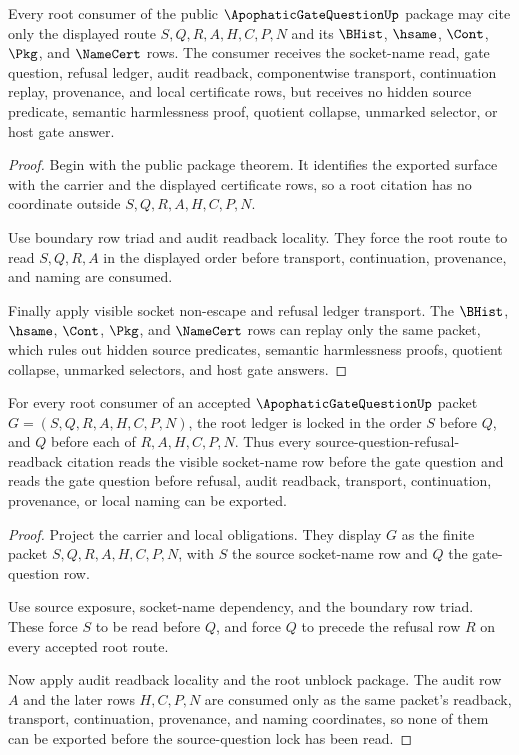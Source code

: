 \begin{theorem}
\label{thm:apophatic-gate-question-root-unblock-package}
Every root consumer of the public $\ApophaticGateQuestionUp$ package may cite only the displayed route $S,Q,R,A,H,C,P,N$ and its $\BHist$, $\hsame$, $\Cont$, $\Pkg$, and $\NameCert$ rows. The consumer receives the socket-name read, gate question, refusal ledger, audit readback, componentwise transport, continuation replay, provenance, and local certificate rows, but receives no hidden source predicate, semantic harmlessness proof, quotient collapse, unmarked selector, or host gate answer.
\end{theorem}
\begin{proof}
Begin with the public package theorem. It identifies the exported surface with the carrier and the displayed certificate rows, so a root citation has no coordinate outside $S,Q,R,A,H,C,P,N$.

Use boundary row triad and audit readback locality. They force the root route to read $S,Q,R,A$ in the displayed order before transport, continuation, provenance, and naming are consumed.

Finally apply visible socket non-escape and refusal ledger transport. The $\BHist$, $\hsame$, $\Cont$, $\Pkg$, and $\NameCert$ rows can replay only the same packet, which rules out hidden source predicates, semantic harmlessness proofs, quotient collapse, unmarked selectors, and host gate answers.
\end{proof}

\begin{theorem}
\label{thm:apophatic-gate-question-source-question-ledger-lock}
For every root consumer of an accepted $\ApophaticGateQuestionUp$ packet $G=(S,Q,R,A,H,C,P,N)$, the root ledger is locked in the order $S$ before $Q$, and $Q$ before each of $R,A,H,C,P,N$. Thus every source-question-refusal-readback citation reads the visible socket-name row before the gate question and reads the gate question before refusal, audit readback, transport, continuation, provenance, or local naming can be exported.
\end{theorem}
\begin{proof}
Project the carrier and local \NameCert{} obligations. They display $G$ as the finite packet $S,Q,R,A,H,C,P,N$, with $S$ the source socket-name row and $Q$ the gate-question row.

Use source exposure, socket-name dependency, and the boundary row triad. These force $S$ to be read before $Q$, and force $Q$ to precede the refusal row $R$ on every accepted root route.

Now apply audit readback locality and the root unblock package. The audit row $A$ and the later rows $H,C,P,N$ are consumed only as the same packet's readback, transport, continuation, provenance, and naming coordinates, so none of them can be exported before the source-question lock has been read.
\end{proof}

